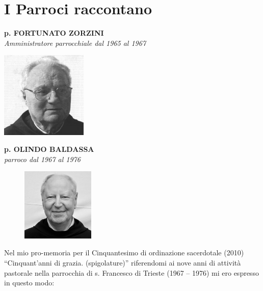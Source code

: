 \chapter{I Parroci raccontano}
\label{chap:Testimonianze}

\begin{center}
\textbf{\Large p. FORTUNATO ZORZINI}\\
	\textit{Amministratore parrocchiale dal 1965 al 1967}
\end{center}
\includegraphics[width=0.31\textwidth]{immagini/zorzini.jpg}
\bigskip
\begin{center}
\textbf{\Large p. OLINDO BALDASSA}\\
	\textit{parroco dal 1967 al 1976}
\end{center}
\bigbreak
\begingroup
\setlength\intextsep{0pt}
\begin{figure}
\centering
\includegraphics[width=0.31\textwidth]{immagini/olindo.jpg}
\end{figure}
\noindent Nel mio pro-memoria per il Cinquantesimo di ordinazione sacerdotale (2010) “Cinquant’anni di grazia. (spigolature)” riferendomi ai nove anni di attività pastorale nella parrocchia di s. Francesco di Trieste (1967 – 1976) mi ero espresso in questo modo:
\bigbreak 
